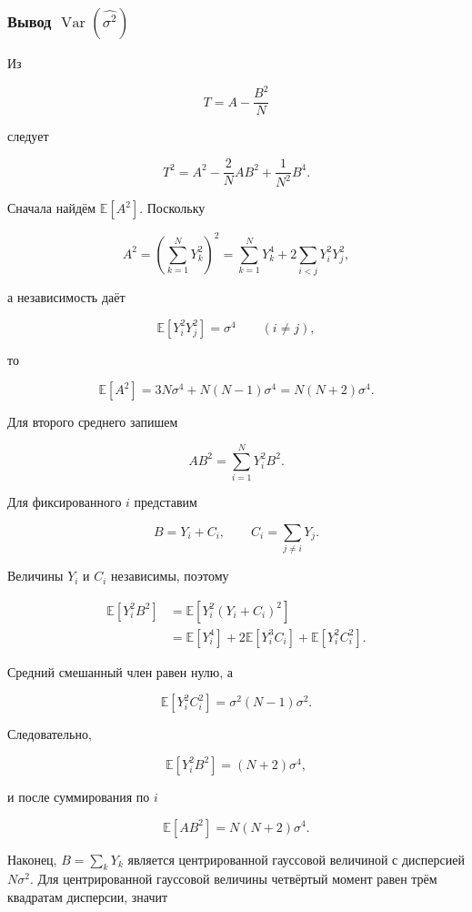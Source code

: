 \documentclass[
  russian,
  12pt,
  a4paper,
  a4paper,
  openany]{scrbook}
\begin{document}
\begin{bookderivation}

\subsubsection{\texorpdfstring{Вывод
\(\operatorname{Var}(\widehat{\sigma^2})\)}{Вывод \textbackslash operatorname\{Var\}(\textbackslash widehat\{\textbackslash sigma\^{}2\})}}\label{ux432ux44bux432ux43eux434-operatornamevarwidehatsigma2}

Из

\[
T=A-\frac{B^2}{N}
\]

следует

\[
T^2
=A^2-\frac{2}{N}AB^2+\frac{1}{N^2}B^4.
\]

Сначала найдём \(\mathbb E[A^2]\). Поскольку

\[
A^2
=\left(\sum_{k=1}^{N}Y_k^2\right)^2
=\sum_{k=1}^{N}Y_k^4+2\sum_{i<j}Y_i^2Y_j^2,
\]

а независимость даёт

\[
\mathbb E[Y_i^2Y_j^2]=\sigma^4\qquad(i\ne j),
\]

то

\[
\mathbb E[A^2]
=3N\sigma^4+N(N-1)\sigma^4
=N(N+2)\sigma^4.
\]

Для второго среднего запишем

\[
AB^2=\sum_{i=1}^{N}Y_i^2B^2.
\]

Для фиксированного \(i\) представим

\[
B=Y_i+C_i,
\qquad
C_i=\sum_{j\ne i}Y_j.
\]

Величины \(Y_i\) и \(C_i\) независимы, поэтому

\[
\begin{aligned}
\mathbb E[Y_i^2B^2]
&=\mathbb E[Y_i^2(Y_i+C_i)^2]\\
&=\mathbb E[Y_i^4]
+2\mathbb E[Y_i^3C_i]
+\mathbb E[Y_i^2C_i^2].
\end{aligned}
\]

Средний смешанный член равен нулю, а

\[
\mathbb E[Y_i^2C_i^2]
=\sigma^2(N-1)\sigma^2.
\]

Следовательно,

\[
\mathbb E[Y_i^2B^2]=(N+2)\sigma^4,
\]

и после суммирования по \(i\)

\[
\boxed{
\mathbb E[AB^2]=N(N+2)\sigma^4.
}
\]

Наконец, \(B=\sum_kY_k\) является центрированной гауссовой величиной с
дисперсией \(N\sigma^2\). Для центрированной гауссовой величины
четвёртый момент равен трём квадратам дисперсии, значит


\end{bookderivation}
\end{document}
